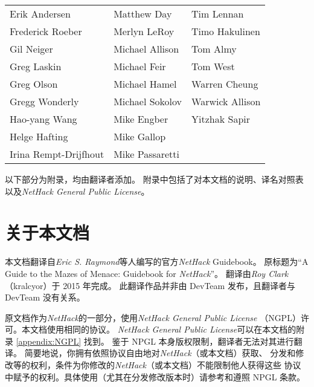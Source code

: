 \documentclass[a4paper, 10pt]{article}
\begin{document}
\begin{center}
\begin{tabular}{lll}
Erik Andersen & Matthew Day & Tim Lennan\\
Frederick Roeber & Merlyn LeRoy & Timo Hakulinen\\
Gil Neiger & Michael Allison & Tom Almy\\
Greg Laskin & Michael Feir & Tom West\\
Greg Olson & Michael Hamel & Warren Cheung\\
Gregg Wonderly & Michael Sokolov & Warwick Allison\\
Hao-yang Wang & Mike Engber & Yitzhak Sapir\\
Helge Hafting & Mike Gallop\\
Irina Rempt-Drijfhout & Mike Passaretti
\end{tabular}
\end{center}


\newpage

\appendix
以下部分为附录，均由翻译者添加。
附录中包括了对本文档的说明、译名对照表以及{\it NetHack General Public License}。

\section{关于本文档}
本文档翻译自{\it Eric S. Raymond}等人编写的官方{\it NetHack} Guidebook。
原标题为“A Guide to the Mazes of Menace: Guidebook for {\it NetHack}”。
翻译由{\it Roy Clark}（kralcyor）于 2015 年完成。
此翻译作品并非由 DevTeam 发布，且翻译者与 DevTeam 没有关系。

原文档作为{\it NetHack}的一部分，使用{\it NetHack General Public License}
（NGPL）许可。本文档使用相同的协议。
{\it NetHack General Public License}可以在本文档的附录
\ref{appendix:NGPL} 找到。
鉴于 NPGL 本身版权限制，翻译者无法对其进行翻译。
简要地说，你拥有依照协议自由地对{\it NetHack}（或本文档）获取、
分发和修改等的权利，条件为你修改的{\it NetHack}（或本文档）不能限制他人获得这些
协议中赋予的权利。具体使用（尤其在分发修改版本时）请参考和遵照 NPGL 条款。
\end{document}
